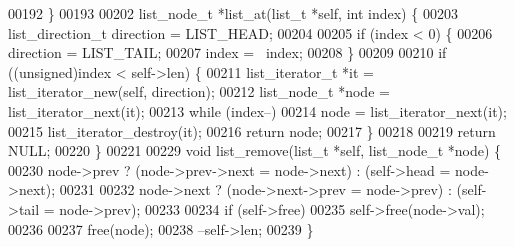 \begin{DoxyCode}
00192 \}
00193 
00202 list_node_t *list_at(list_t *\textcolor{keyword}{self}, \textcolor{keywordtype}{int} index) \{
00203   list_direction_t direction = LIST_HEAD;
00204 
00205   \textcolor{keywordflow}{if} (index < 0) \{
00206     direction = LIST_TAIL;
00207     index = ~index;
00208   \}
00209 
00210   \textcolor{keywordflow}{if} ((\textcolor{keywordtype}{unsigned})index < self->len) \{
00211     list_iterator_t *it = list_iterator_new(\textcolor{keyword}{self}, direction);
00212     list_node_t *node = list_iterator_next(it);
00213     \textcolor{keywordflow}{while} (index--)
00214       node = list_iterator_next(it);
00215     list_iterator_destroy(it);
00216     \textcolor{keywordflow}{return} node;
00217   \}
00218 
00219   \textcolor{keywordflow}{return} NULL;
00220 \}
00221 
00229 \textcolor{keywordtype}{void} list_remove(list_t *\textcolor{keyword}{self}, list_node_t *node) \{
00230   node->prev ? (node->prev->next = node->next) : (self->head = node->next);
00231 
00232   node->next ? (node->next->prev = node->prev) : (self->tail = node->prev);
00233 
00234   \textcolor{keywordflow}{if} (self->free)
00235     \textcolor{keyword}{self}->free(node->val);
00236 
00237   free(node);
00238   --\textcolor{keyword}{self}->len;
00239 \}
\end{DoxyCode}
